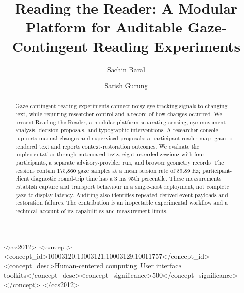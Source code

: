 \documentclass[sigconf,screen,nonacm]{acmart}
\begin{document}
\title[Reading the Reader: A Modular Platform for Gaze-Contingent Reading Experiments]{Reading the Reader: A Modular Platform for Auditable Gaze-Contingent Reading Experiments}
\author{Sachin Baral}
\author{Satish Gurung}
\renewcommand{\shortauthors}{Baral and Gurung}

\begin{abstract}
Gaze-contingent reading experiments connect noisy eye-tracking signals to changing text, while requiring researcher control and a record of how changes occurred. We present Reading the Reader, a modular platform separating sensing, eye-movement analysis, decision proposals, and typographic interventions. A researcher console supports manual changes and supervised proposals; a participant reader maps gaze to rendered text and reports context-restoration outcomes. We evaluate the implementation through automated tests, eight recorded sessions with four participants, a separate advisory-provider run, and browser geometry records. The sessions contain 175,860 gaze samples at a mean session rate of 89.89 Hz; participant-client diagnostic round-trip time has a 3 ms 95th percentile. These measurements establish capture and transport behaviour in a single-host deployment, not complete gaze-to-display latency. Auditing also identifies repeated derived-event payloads and restoration failures. The contribution is an inspectable experimental workflow and a technical account of its capabilities and measurement limits.
\end{abstract}

\begin{CCSXML}
<ccs2012>
 <concept><concept_id>10003120.10003121.10003129.10011757</concept_id><concept_desc>Human-centered computing~User interface toolkits</concept_desc><concept_significance>500</concept_significance></concept>
</ccs2012>
\end{CCSXML}
\maketitle
\hypersetup{hidelinks}
\raggedbottom









\balance



\appendix

\end{document}
